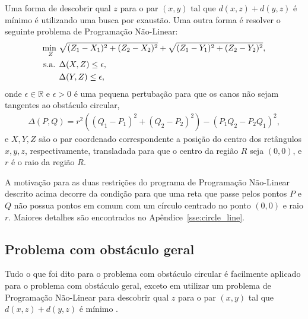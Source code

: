 Uma forma de descobrir qual $z$ para o par $(x, y)$ tal que $d(x, z) + d(y, z)$
é mínimo é utilizando uma busca por exaustão. Uma outra forma é resolver o
seguinte problema de Programação Não-Linear:
\begin{align}
    \underset{Z}{\text{min }} & \sqrt{(Z_1 - X_1)^2 + (Z_2 - X_2)^2} +
    \sqrt{(Z_1 - Y_1)^2 + (Z_2 - Y_2)^2}, \notag \\
    \text{s.a. } & \Delta(X, Z) \leq \epsilon, \label{eq:pnl_aux} \\
    & \Delta(Y, Z) \leq \epsilon, \notag
\end{align}
onde $\epsilon \in \mathbb{R}$ e $\epsilon > 0$ é uma pequena pertubação para
que os canos não sejam tangentes ao obstáculo circular,
\begin{align*}
    \Delta(P, Q) = r^2 \left( (Q_1 - P_1)^2 + (Q_2 - P_2)^2 \right) - \left(
    P_1 Q_2 - P_2 Q_1 \right)^2,
\end{align*}
e $X, Y, Z$ são o par coordenado correspondente a posição do centro dos
retângulos $x, y, z$, respectivamente, transladada para que o centro da região
$R$ seja $(0, 0)$, e $r$ é o raio da região $R$.

A motivação para as duas restrições do programa de Programação Não-Linear
descrito acima decorre da condição para que uma reta que passe pelos pontos $P$
e $Q$ não possua pontos em comum com um círculo centrado no ponto $(0, 0)$ e
raio $r$. Maiores detalhes são encontrados no Apêndice~\ref{sse:circle_line}.

\subsection{Problema com obst\'{a}culo geral}
Tudo o que foi dito para o problema com obst\'{a}culo circular \'{e} facilmente
aplicado para o problema com obst\'{a}culo geral, exceto em utilizar um problema
de Programação Não-Linear para descobrir qual $z$ para o par $(x, y)$ tal que
$d(x, z) + d(y, z)$ é mínimo .

